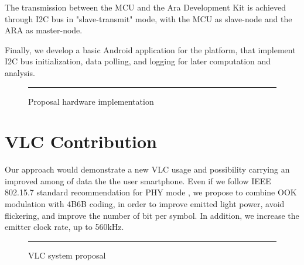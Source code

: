 The transmission between the MCU and the Ara Development Kit is achieved through I2C bus in "slave-transmit" mode, with the MCU as slave-node and the ARA as master-node.

Finally, we develop a basic Android application for the platform, that implement I2C bus initialization, data polling, and logging for later computation and analysis.

\begin{figure}[htbp]
  \centering
    \rule{35em}{0.5pt}
  \caption[Proposal hardware implementation]{Proposal hardware implementation}
  \label{fig:RxCircuit}
\end{figure}



\section{VLC Contribution}

Our approach would demonstrate a new VLC usage and possibility carrying an improved among of data the the user smartphone. Even if we follow IEEE 802.15.7 standard recommendation for PHY mode , we propose to combine OOK modulation with 4B6B coding, in order to improve emitted light power, avoid flickering, and improve the number of bit per symbol. In addition, we increase the emitter clock rate, up to 560kHz.

\begin{figure}[htbp]
  \centering
    \rule{35em}{0.5pt}
  \caption[VLC system proposal]{VLC system proposal}
  \label{fig:RxCircuit}
\end{figure}


